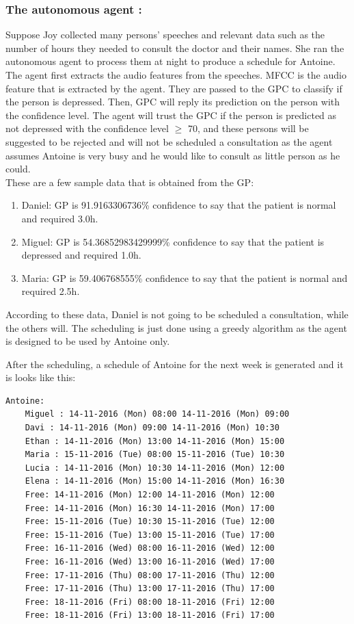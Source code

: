 \documentclass{article}
\begin{document}
    \subsubsection{The autonomous agent :}
    Suppose Joy collected many persons' speeches and relevant data such as the number of hours they needed to consult the doctor and their names. 
    She ran the autonomous agent to process them at night to produce a schedule for Antoine.
    The agent first extracts the audio features from the speeches.
    MFCC is the audio feature that is extracted by the agent. They are passed to the GPC to classify if the person is depressed. 
    Then, GPC will reply its prediction on the person with the confidence level.
    The agent will trust the GPC if the person is predicted as not depressed with the confidence level \(\geq\) 70,
    and these persons will be suggested to be rejected and will not be scheduled a consultation as the agent assumes Antoine is very busy and 
    he would like to consult as little person as he could. \\

    These are a few sample data that is obtained from the GP:
    \begin{enumerate}
         \item Daniel: GP is 91.9163306736\% confidence to say that the patient is normal and required 3.0h.
        \item Miguel: GP is 54.36852983429999\% confidence to say that the patient is depressed and required 1.0h.
        \item Maria: GP is 59.406768555\% confidence to say that the patient is normal and required 2.5h.
         \end{enumerate}

    According to these data, Daniel is not going to be scheduled a consultation, while the others will.
    The scheduling is just done using a greedy algorithm as the agent is designed to be used by Antoine only.

    After the scheduling, a schedule of Antoine for the next week is generated and it is looks like this:

    \begin{Verbatim}[fontsize=\tiny]
    Antoine:
    Miguel : 14-11-2016 (Mon) 08:00 14-11-2016 (Mon) 09:00
    Davi : 14-11-2016 (Mon) 09:00 14-11-2016 (Mon) 10:30
    Ethan : 14-11-2016 (Mon) 13:00 14-11-2016 (Mon) 15:00
    Maria : 15-11-2016 (Tue) 08:00 15-11-2016 (Tue) 10:30
    Lucia : 14-11-2016 (Mon) 10:30 14-11-2016 (Mon) 12:00
    Elena : 14-11-2016 (Mon) 15:00 14-11-2016 (Mon) 16:30
    Free: 14-11-2016 (Mon) 12:00 14-11-2016 (Mon) 12:00
    Free: 14-11-2016 (Mon) 16:30 14-11-2016 (Mon) 17:00
    Free: 15-11-2016 (Tue) 10:30 15-11-2016 (Tue) 12:00
    Free: 15-11-2016 (Tue) 13:00 15-11-2016 (Tue) 17:00
    Free: 16-11-2016 (Wed) 08:00 16-11-2016 (Wed) 12:00
    Free: 16-11-2016 (Wed) 13:00 16-11-2016 (Wed) 17:00
    Free: 17-11-2016 (Thu) 08:00 17-11-2016 (Thu) 12:00
    Free: 17-11-2016 (Thu) 13:00 17-11-2016 (Thu) 17:00
    Free: 18-11-2016 (Fri) 08:00 18-11-2016 (Fri) 12:00
    Free: 18-11-2016 (Fri) 13:00 18-11-2016 (Fri) 17:00
    \end{Verbatim}
\end{document}
